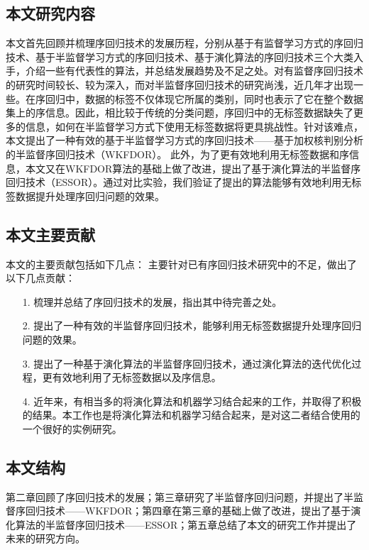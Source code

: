 \subsection{本文研究内容}
本文首先回顾并梳理序回归技术的发展历程，分别从基于有监督学习方式的序回归技术、基于半监督学习方式的序回归技术、基于演化算法的序回归技术三个大类入手，介绍一些有代表性的算法，并总结发展趋势及不足之处。对有监督序回归技术的研究时间较长、较为深入，而对半监督序回归技术的研究尚浅，近几年才出现一些。在序回归中，数据的标签不仅体现它所属的类别，同时也表示了它在整个数据集上的序信息。因此，相比较于传统的分类问题，序回归中的无标签数据缺失了更多的信息，如何在半监督学习方式下使用无标签数据将更具挑战性。针对该难点，本文提出了一种有效的基于半监督学习方式的序回归技术——基于加权核判别分析的半监督序回归技术（WKFDOR\citep{wu2015evolutionary}）。
此外，为了更有效地利用无标签数据和序信息，本文又在WKFDOR算法的基础上做了改进，提出了基于演化算法的半监督序回归技术（ESSOR\citep{wu2015evolutionary}）。通过对比实验，我们验证了提出的算法能够有效地利用无标签数据提升处理序回归问题的效果。

\subsection{本文主要贡献}
本文的主要贡献包括如下几点：
主要针对已有序回归技术研究中的不足，做出了以下几点贡献：
\begin{enumerate}
\item[1.]梳理并总结了序回归技术的发展，指出其中待完善之处。
\item[2.]提出了一种有效的半监督序回归技术，能够利用无标签数据提升处理序回归问题的效果。
\item[3.]提出了一种基于演化算法的半监督序回归技术，通过演化算法的迭代优化过程，更有效地利用了无标签数据以及序信息。
\item[4.]近年来，有相当多的将演化算法和机器学习结合起来的工作，并取得了积极的结果。本工作也是将演化算法和机器学习结合起来，是对这二者结合使用的一个很好的实例研究。
\end{enumerate}

\subsection{本文结构}
第二章回顾了序回归技术的发展；第三章研究了半监督序回归问题，并提出了半监督序回归技术——WKFDOR；第四章在第三章的基础上做了改进，提出了基于演化算法的半监督序回归技术——ESSOR；第五章总结了本文的研究工作并提出了未来的研究方向。
